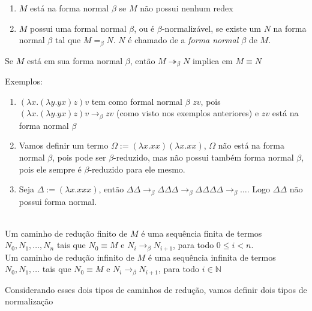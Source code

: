 \documentclass[../main.tex]{subfiles}
\begin{document}
\begin{definition}
    \hfill
    \begin{enumerate}
        \item $M$ está na forma normal $\beta$ se $M$ não possui nenhum redex
        \item $M$ possui uma formal normal $\beta$, ou é $\beta$-normalizável, se existe um $N$ na forma normal $\beta$ tal que $M =_{\beta} N$. $N$ é chamado de a \emph{forma normal $\beta$} de $M$.
    \end{enumerate}
\end{definition}

\begin{lemma}
    Se $M$ está em sua forma normal $\beta$, então $M \twoheadrightarrow_{\beta} N$ implica em $M \equiv N$
\end{lemma}

Exemplos:

\begin{enumerate}
    \item $(\lambda x . (\lambda y . yx)z)v$ tem como formal normal $\beta$ $zv$, pois $(\lambda x . (\lambda y . yx)z)v \to_{\beta} zv$ (como visto nos exemplos anteriores) e $zv$ está na forma normal $\beta$
    \item Vamos definir um termo $\Omega := (\lambda x . xx)(\lambda x . xx)$, $\Omega$ não está na forma normal $\beta$, pois pode ser $\beta$-reduzido, mas não possui também forma normal $\beta$, pois ele sempre é $\beta$-reduzido para ele mesmo.
    \item Seja $\Delta := (\lambda x . xxx)$, então $\Delta \Delta \to_{\beta} \Delta \Delta \Delta \to_{\beta} \Delta \Delta \Delta \Delta \to_{\beta} \dots $. Logo $\Delta \Delta$ não possui forma normal. 
\end{enumerate}

\begin{definition}
    \hfill\\
    Um caminho de redução finito de $M$ é uma sequência finita de termos $N_0, N_1, \dots, N_n$ tais que $N_0 \equiv M$ e $N_i \to_{\beta} N_{i+1}$, para todo $0 \leq i < n$.
    \\
    Um caminho de redução infinito de $M$ é uma sequência infinita de termos $N_0, N_1, \dots$ tais que $N_0 \equiv M$ e $N_i \to_{\beta} N_{i+1}$, para todo $i \in \mathbb{N}$
\end{definition}

Considerando esses dois tipos de caminhos de redução, vamos definir dois tipos de normalização
\end{document}
